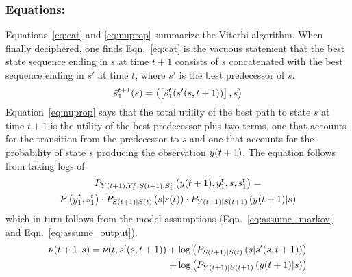 \subsubsection*{Equations:}
Equations~\eqref{eq:cat} and \eqref{eq:nuprop} summarize the Viterbi
algorithm.  When finally deciphered, one finds Eqn.~\eqref{eq:cat} is
the vacuous statement that the best state sequence ending in $s$ at
time $t+1$ consists of $s$ concatenated with the best sequence ending
in $s'$ at time $t$, where $s'$ is the best predecessor of $s$.
\begin{equation}
  \label{eq:cat}
  \hat s_{1}^{t+1} (s) = \left( \left[\hat s_{1}^{t}
      (s'(s,t+1))\right],s \right)
\end{equation}
Equation~\eqref{eq:nuprop} says that the total utility of the best
path to state $s$ at time $t+1$ is the utility of the best
predecessor plus two terms, one that accounts for the transition from
the predecessor to $s$ and one that accounts for the probability of
state $s$ producing the observation ${y}{(t+1)}$.  The equation
follows from taking logs of
\begin{multline*}
  P_{{Y}{(t+1)},Y_{1}^{t},{S}{(t+1)},S_{1}^{t}}
  \left({y}{(t+1)},y_{1}^{t},s,s_{1}^{t} \right) =\\
  P\left(y_{1}^{t}, s_{1}^{t} \right) \cdot
  P_{{S}{(t+1)}|{S}{(t)}} \left(s|{s}{(t)} \right) \cdot
  P_{{Y}{(t+1)}|{S}{(t+1)}} \left({y}{(t+1)}|s \right)
\end{multline*}
which in turn follows from the model assumptions
(Eqn.~\eqref{eq:assume_markov} and Eqn.~\eqref{eq:assume_output}).
\begin{equation}
  \label{eq:nuprop}
  \begin{split}
    \nu (t+1,s) = \nu(t,s'(s,t+1)) +
    \log\left(P_{{S}{(t+1)}|{S}{(t)}} \left(s|s'(s,t+1) \right)\right)\\
    \quad + \log \left( P_{{Y}{(t+1)}|{S}{(t+1)}}
      \left({y}{(t+1)}|s\right)\right)
  \end{split}
\end{equation}

